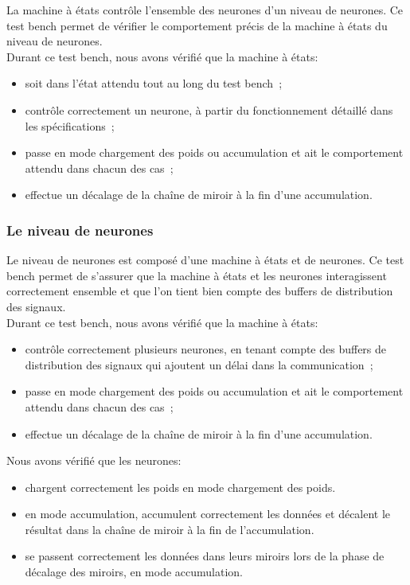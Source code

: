 La machine à états contrôle l'ensemble des neurones d'un niveau de neurones.
Ce test bench permet de vérifier le comportement précis de la machine
à états du niveau de neurones.\\

Durant ce test bench, nous avons vérifié que la machine à états:
\begin{itemize}
	\item soit dans l'état attendu tout au long du test bench~;
	\item contrôle correctement un neurone, à partir du fonctionnement
	détaillé dans les spécifications~;
	\item passe en mode chargement des poids ou accumulation et ait le
	comportement attendu dans chacun des cas~;
	\item effectue un décalage de la chaîne de miroir à la fin d'une
	accumulation.
\end{itemize}

\subsubsection{Le niveau de neurones}

Le niveau de neurones est composé d'une machine à états et de neurones.
Ce test bench permet de s'assurer que la machine à états et les neurones
interagissent correctement ensemble et que l'on tient bien compte des buffers
de distribution des signaux.\\

Durant ce test bench, nous avons vérifié que la machine à états:
\begin{itemize}
	\item contrôle correctement plusieurs neurones, en tenant
	compte des buffers de distribution des signaux qui ajoutent un
	délai dans la communication~;
	\item passe en mode chargement des poids ou accumulation et ait le
	comportement attendu dans chacun des cas~;
	\item effectue un décalage de la chaîne de miroir à la fin d'une
	accumulation.
\end{itemize}

Nous avons vérifié que les neurones:
\begin{itemize}
	\item chargent correctement les poids en mode chargement des poids.
	\item en mode accumulation, accumulent correctement les données et
	décalent le résultat dans la chaîne de miroir à la fin de
	l'accumulation.
	\item se passent correctement les données dans leurs miroirs lors
	de la phase de décalage des miroirs, en mode accumulation.
\end{itemize}

